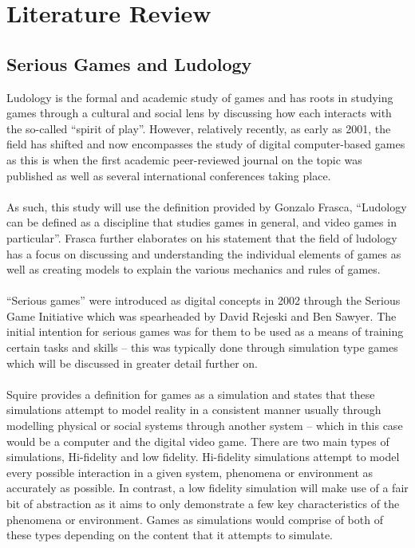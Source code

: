 \documentclass[conference]{IEEEtran}
\begin{document}
\section{Literature Review}
\subsection{Serious Games and Ludology}
Ludology is the formal and academic study of games and has roots in studying games through a cultural and social lens by discussing how each interacts with the so-called “spirit of play”\cite{Huizinga1949}. However, relatively recently, as early as 2001, the field has shifted and now encompasses the study of digital computer-based games as this is when the first academic peer-reviewed journal on the topic was published as well as several international conferences taking place\cite{Frasca2013}. 
\\\\
As such, this study will use the definition provided by Gonzalo Frasca, “Ludology can be defined as a discipline that studies games in general, and video games in particular”\cite{Frasca2013}. Frasca\cite{Frasca2013} further elaborates on his statement that the field of ludology has a focus on discussing and understanding the individual elements of games as well as creating models to explain the various mechanics and rules of games. 
\\\\
“Serious games” were introduced as digital concepts in 2002 through the Serious Game Initiative which was spearheaded by David Rejeski and Ben Sawyer\cite{DeGloria2014}. The initial intention for serious games was for them to be used as a means of training certain tasks and skills\cite{DeGloria2014} – this was typically done through simulation type games which will be discussed in greater detail further on.
\\\\
Squire\cite{Squire2003} provides a definition for games as a simulation and states that these simulations attempt to model reality in a consistent manner usually through modelling physical or social systems through another system – which in this case would be a computer and the digital video game. There are two main types of simulations, Hi-fidelity and low fidelity. Hi-fidelity simulations attempt to model every possible interaction in a given system, phenomena or environment as accurately as possible\cite{Squire2003}. In contrast, a low fidelity simulation will make use of a fair bit of abstraction as it aims to only demonstrate a few key characteristics of the phenomena or environment\cite{Squire2003}. Games as simulations would comprise of both of these types depending on the content that it attempts to simulate.
\end{document}

